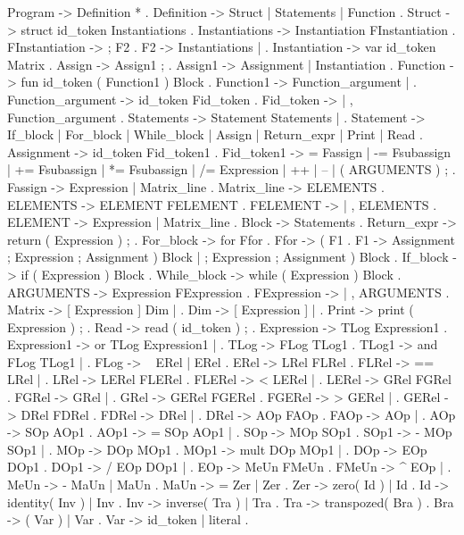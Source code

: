 Program ->   Definition * .
Definition ->    Struct |   Statements |   Function .
Struct ->    struct id_token { Instantiations } .
Instantiations -> Instantiation FInstantiation .
FInstantiation -> ; F2 .
F2 -> Instantiations | \epsilon.
Instantiation -> var id_token Matrix .
Assign ->    Assign1 ; .
Assign1 ->   Assignment |   Instantiation .
Function ->  fun id_token ( Function1 ) Block .
Function1 -> Function_argument |   \epsilon .
Function_argument -> id_token Fid_token .
Fid_token -> \epsilon |   , Function_argument .
Statements -> Statement Statements | \epsilon .
Statement -> If_block | For_block |   While_block |   Assign |   Return_expr |   Print |   Read .
Assignment ->    id_token Fid_token1 .
Fid_token1 ->    = Fassign |   -= Fsubassign |   += Fsubassign |   *= Fsubassign |   /= Expression |   ++ |   -- | ( ARGUMENTS ) ; .
Fassign ->   Expression |   Matrix_line .
Matrix_line ->   { ELEMENTS } .
ELEMENTS ->  ELEMENT FELEMENT .
FELEMENT ->  \epsilon |   , ELEMENTS .
ELEMENT ->   Expression |   Matrix_line .
Block -> { Statements } .
Return_expr ->   return ( Expression ) ; .
For_block -> for Ffor .
Ffor ->  ( F1 .
F1 ->    Assignment ; Expression ; Assignment ) Block |   \epsilon ; Expression ; Assignment ) Block .
If_block ->  if ( Expression ) Block .
While_block ->   while ( Expression ) Block .
ARGUMENTS -> Expression FExpression .
FExpression -> \epsilon |   , ARGUMENTS .
Matrix ->    [ Expression ] Dim | \epsilon.
Dim ->   [ Expression ] |   \epsilon .
Print -> print ( Expression ) ; .
Read ->  read ( id_token ) ; .
Expression ->    TLog Expression1 .
Expression1 ->   or TLog Expression1 | \epsilon    .
TLog ->  FLog TLog1 .
TLog1 -> and FLog TLog1 | \epsilon    .
FLog ->  ~ ERel |   ERel .
ERel ->  LRel FLRel .
FLRel -> == LRel | \epsilon    .
LRel ->  LERel FLERel .
FLERel ->    < LERel | \epsilon    .
LERel -> GRel FGRel .
FGRel -> \leq GRel | \epsilon    .
GRel ->  GERel FGERel .
FGERel ->    > GERel | \epsilon    .
GERel -> DRel FDRel .
FDRel -> \geq DRel | \epsilon    .
DRel ->  AOp FAOp .
FAOp ->  \neq AOp | \epsilon    .
AOp ->   SOp AOp1 .
AOp1 ->  = SOp AOp1 | \epsilon    .
SOp ->   MOp SOp1 .
SOp1 ->  - MOp SOp1 | \epsilon    .
MOp ->   DOp MOp1 .
MOp1 ->  mult DOp MOp1 | \epsilon    .
DOp ->   EOp DOp1 .
DOp1 ->  / EOp DOp1 | \epsilon    .
EOp ->   MeUn FMeUn .
FMeUn -> ^ EOp | \epsilon    .
MeUn ->  - MaUn |   MaUn .
MaUn ->  = Zer |   Zer .
Zer ->   zero( Id ) |   Id .
Id ->    identity( Inv ) |   Inv .
Inv ->   inverse( Tra ) |   Tra .
Tra ->   transpozed( Bra ) .
Bra ->   ( Var ) | Var .
Var ->   id_token | literal .